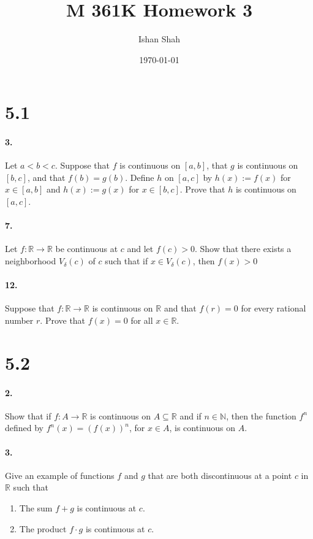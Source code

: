 \documentclass[12pt]{article}
\theoremstyle{remark}
\begin{document}
\title{M 361K Homework 3}
\author{Ishan Shah}
\date{\today}
\maketitle

\section*{5.1}
\paragraph{3.} Let $a<b<c$. Suppose that $f$ is continuous on $[a, b]$, that $g$ is continuous on $[b, c]$, and that $f(b)=g(b)$. Define $h$ on $[a, c]$ by $h(x):=f(x)$ for $x \in[a, b]$ and $h(x):=g(x)$ for $x \in[b, c]$. Prove that $h$ is continuous on $[a, c]$.

\paragraph{7.} Let $f: \mathbb{R} \rightarrow \mathbb{R}$ be continuous at $c$ and let $f(c)>0$. Show that there exists a neighborhood $V_\delta(c)$ of $c$ such that if $x \in V_\delta(c)$, then $f(x)>0$

\paragraph{12.} Suppose that $f: \mathbb{R} \rightarrow \mathbb{R}$ is continuous on $\mathbb{R}$ and that $f(r)=0$ for every rational number $r$. Prove that $f(x)=0$ for all $x \in \mathbb{R}$.

\section*{5.2}
\paragraph{2.} Show that if $f: A \rightarrow \mathbb{R}$ is continuous on $A \subseteq \mathbb{R}$ and if $n \in \mathbb{N}$, then the function $f^n$ defined by $f^n(x)=(f(x))^n$, for $x \in A$, is continuous on $A$.

\paragraph{3.} Give an example of functions $f$ and $g$ that are both discontinuous at a point $c$ in $\mathbb{R}$ such that
\begin{enumerate}[label=(\alph*)]
    \item The sum $f+g$ is continuous at $c$.
    \item The product $f \cdot g$ is continuous at $c$.
\end{enumerate}
\end{document}
